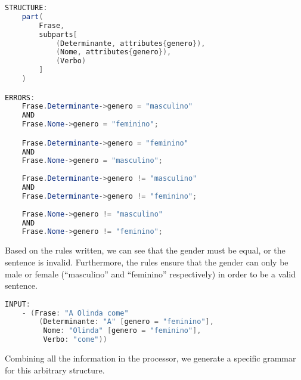 \begin{center}
\begin{minipage}{11cm}
\begin{lstlisting}[language=java, basicstyle=\small, label={lst:arbitrary_structure}, caption=Example of an arbitrary sentence structure]
STRUCTURE:
    part(
        Frase,
        subparts[
            (Determinante, attributes{genero}),
            (Nome, attributes{genero}),
            (Verbo)
        ]
    )

ERRORS:
    Frase.Determinante->genero = "masculino" 
    AND
    Frase.Nome->genero = "feminino";

    Frase.Determinante->genero = "feminino" 
    AND
    Frase.Nome->genero = "masculino";
    
    Frase.Determinante->genero != "masculino"
    AND 
    Frase.Determinante->genero != "feminino";
    
    Frase.Nome->genero != "masculino" 
    AND 
    Frase.Nome->genero != "feminino";
\end{lstlisting}
\end{minipage}
\end{center}

Based on the rules written, we can see that the gender must be equal, or the sentence is invalid. Furthermore, the rules ensure that the gender can only be male or female (``masculino'' and ``feminino'' respectively) in order
to be a valid sentence.

\begin{center}
\begin{minipage}{11cm}
\begin{lstlisting}[language=java, basicstyle=\small, label={lst:arbitrary_structure_input}, caption=Example of an arbitrary sentence input]
INPUT:
    - (Frase: "A Olinda come"
        (Determinante: "A" [genero = "feminino"],
         Nome: "Olinda" [genero = "feminino"],
         Verbo: "come"))
\end{lstlisting}
\end{minipage}
\end{center}

Combining all the information in the processor, we generate a specific grammar for this arbitrary structure.

